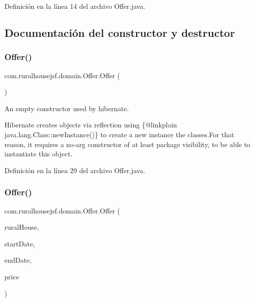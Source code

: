 Definición en la línea 14 del archivo Offer.\+java.



\subsection{Documentación del constructor y destructor}
\mbox{\label{classcom_1_1ruralhousejsf_1_1domain_1_1_offer_aa25c14124afd5f3f53c26ef4a564397d}} 
\subsubsection{\texorpdfstring{Offer()}{Offer()}\hspace{0.1cm}{\footnotesize\ttfamily [1/3]}}
{\footnotesize\ttfamily com.\+ruralhousejsf.\+domain.\+Offer.\+Offer (\begin{DoxyParamCaption}{ }\end{DoxyParamCaption})\hspace{0.3cm}{\ttfamily [package]}}

An empty constructor used by hibernate. 

Hibernate creates objects via reflection using \{@linkplain java.\+lang.\+Class\+::new\+Instance()\} to create a new instance the classes.\+For that reason, it requires a no-\/arg constructor of at least package visibility, to be able to instantiate this object. 

Definición en la línea 29 del archivo Offer.\+java.

\mbox{\label{classcom_1_1ruralhousejsf_1_1domain_1_1_offer_ac2559262a3321b69ab5abb4ae28ade81}} 
\subsubsection{\texorpdfstring{Offer()}{Offer()}\hspace{0.1cm}{\footnotesize\ttfamily [2/3]}}
{\footnotesize\ttfamily com.\+ruralhousejsf.\+domain.\+Offer.\+Offer (\begin{DoxyParamCaption}\item[{\mbox{\hyperlink{classcom_1_1ruralhousejsf_1_1domain_1_1_rural_house}{Rural\+House}}}]{rural\+House,  }\item[{Local\+Date}]{start\+Date,  }\item[{Local\+Date}]{end\+Date,  }\item[{double}]{price }\end{DoxyParamCaption})}

